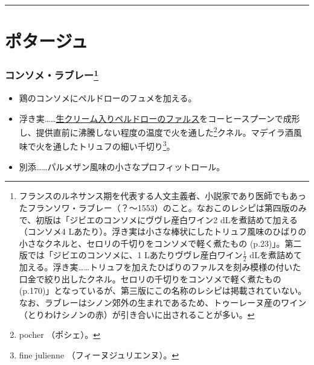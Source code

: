 \begin{center}\rule{0.5\linewidth}{\linethickness}\end{center}
\newpage
\hypertarget{Potages}{%
\section{ポタージュ}\label{Potages}}
\begin{recette}
\hypertarget{consomme-rabelais}{%
\subsubsection[コンソメ・ラブレー]{\texorpdfstring{コンソメ・ラブレー\footnote{フランスのルネサンス期を代表する人文主義者、小説家であり医師でもあったフランソワ・ラブレー（？〜1553）のこと。なおこのレシピは第四版のみで、初版は「ジビエのコンソメにヴヴレ産白ワイン2
  dLを煮詰めて加える（コンソメ4
  Lあたり）。浮き実は小さな棒状にしたトリュフ風味のひばりの小さなクネルと、セロリの千切りをコンソメで軽く煮たもの
  (p.23)」。第二版では「ジビエのコンソメに、1
  Lあたりヴヴレ産白ワイン\(\frac{1}{2}\)
  dLを煮詰めて加える。浮き実\ldots{}\ldots{}トリュフを加えたひばりのファルスを刻み模様の付いた口金で絞り出したクネル。セロリの千切りをコンソメで軽く煮たもの(p.170)」となっているが、第三版にこの名称のレシピは掲載されていない。なお、ラブレーはシノン郊外の生まれであるため、トゥーレーヌ産のワイン（とりわけシノンの赤）が引き合いに出されることが多い。}}{コンソメ・ラブレー}}\label{consomme-rabelais}}

\begin{itemize}
\item
  鶏のコンソメにペルドローのフュメを加える。
\item
  浮き実\ldots{}\ldots{}\protect\hyperlink{farce-c}{生クリーム入りペルドローのファルス}をコーヒースプーンで成形し、提供直前に沸騰しない程度の温度で火を通した\footnote{pocher
    （ポシェ）。}クネル。マデイラ酒風味で火を通したトリュフの細い千切り\footnote{fine
    julienne （フィーヌジュリエンヌ）。}。
\item
  別添\ldots{}\ldots{}パルメザン風味の小さなプロフィットロール。
\end{itemize}

\hypertarget{puree-conde}{%
}
\end{recette}
